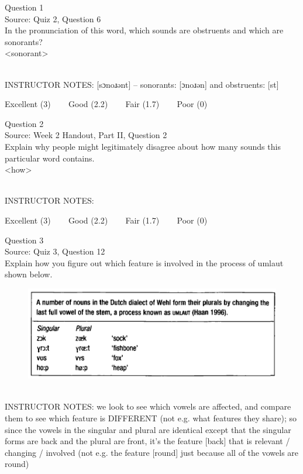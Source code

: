 \documentclass[12pt]{article}
\begin{document}
{\large Question 1}\\

Source: Quiz 2, Question 6\\

In the pronunciation of this word, which sounds are obstruents and which are sonorants?\\

<sonorant>


~\\
INSTRUCTOR NOTES: [sɔnoɹənt] -- sonorants: [ɔnoɹən] and obstruents: [st]


\vfill
Excellent (3) ~~~ Good (2.2) ~~~ Fair (1.7) ~~~ Poor (0)
\newpage

{\large Question 2}\\

Source: Week 2 Handout, Part II, Question 2\\

Explain why people might legitimately disagree about how many sounds this particular word contains.\\

<how>


~\\
INSTRUCTOR NOTES: 


\vfill
Excellent (3) ~~~ Good (2.2) ~~~ Fair (1.7) ~~~ Poor (0)
\newpage

{\large Question 3}\\

Source: Quiz 3, Question 12\\

Explain how you figure out which feature is involved in the process of umlaut shown below.\\

\begin{figure}[H]
\includegraphics{../images/dutch.png}
\end{figure}

~\\
INSTRUCTOR NOTES: we look to see which vowels are affected, and compare them to see which feature is DIFFERENT (not e.g. what features they share); so since the vowels in the singular and plural are identical except that the singular forms are back and the plural are front, it's the feature [back] that is relevant / changing / involved (not e.g. the feature [round] just because all of the vowels are round)
\end{document}
